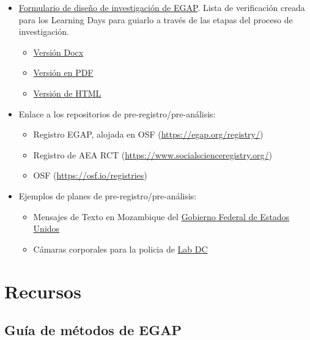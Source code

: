 \documentclass[12pt,spanish,]{book}
\begin{document}
\begin{itemize}
\item
  \href{https://egap.github.io/learningdays-resources/Exercises/design-form.html}{Formulario de diseño de investigación de EGAP}. Lista de verificación creada para los Learning Days para guiarlo a través de las etapas del proceso de investigación.

  \begin{itemize}
  \item
    \href{https://egap.github.io/learningdays-resources/Exercises/design-form.docx}{Versión Docx}
  \item
    \href{https://egap.github.io/learningdays-resources/Exercises/design-form.pdf}{Versión en PDF}
  \item
    \href{https://egap.github.io/learningdays-resources/Exercises/design-form.html}{Versión de HTML}
  \end{itemize}
\item
  Enlace a los repositorios de pre-registro/pre-análisis:

  \begin{itemize}
  \item
    Registro EGAP, alojada en OSF (\url{https://egap.org/registry/})
  \item
    Registro de AEA RCT (\url{https://www.socialscienceregistry.org/})
  \item
    OSF (\url{https://osf.io/registries})
  \end{itemize}
\item
  Ejemplos de planes de pre-registro/pre-análisis:

  \begin{itemize}
  \item
    Mensajes de Texto en Mozambique del \href{https://oes.gsa.gov/projects/sms-mozambique/}{Gobierno Federal de Estados Unidos}
  \item
    Cámaras corporales para la policia de \href{https://osf.io/472zh}{Lab DC}
  \end{itemize}
\end{itemize}

\hypertarget{recursos}{%
\section{Recursos}\label{recursos}}

\hypertarget{guuxeda-de-muxe9todos-de-egap}{%
\subsection{Guía de métodos de EGAP}\label{guuxeda-de-muxe9todos-de-egap}}
\end{document}
